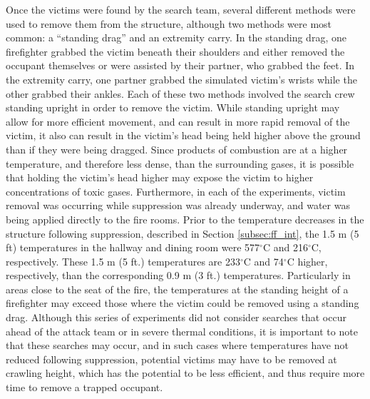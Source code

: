 \documentclass[12pt,oneside]{article}
\begin{document}
Once the victims were found by the search team, several different methods were used to remove them from the structure, although two methods were most common: a ``standing drag'' \cite{IAFC} and an extremity carry. In the standing drag, one firefighter grabbed the victim beneath their shoulders and either removed the occupant themselves or were assisted by their partner, who grabbed the feet. In the extremity carry, one partner grabbed the simulated victim's wrists while the other grabbed their ankles. Each of these two methods involved the search crew standing upright in order to remove the victim. While standing upright may allow for more efficient movement, and can result in more rapid removal of the victim, it also can result in the victim's head being held higher above the ground than if they were being dragged. Since products of combustion are at a higher temperature, and therefore less dense, than the surrounding gases, it is possible that holding the victim's head higher may expose the victim to higher concentrations of toxic gases. Furthermore, in each of the experiments, victim removal was occurring while suppression was already underway, and water was being applied directly to the fire rooms. Prior to the temperature decreases in the structure following suppression, described in Section \ref{subsec:ff_int}, the 1.5 m (5 ft) temperatures in the hallway and dining room were 577$^{\circ}$C and 216$^{\circ}$C, respectively. These 1.5 m (5 ft.) temperatures are 233$^{\circ}$C and 74$^{\circ}$C higher, respectively, than the corresponding 0.9 m (3 ft.) temperatures. Particularly in areas close to the seat of the fire, the temperatures at the standing height of a firefighter may exceed those where the victim could be removed using a standing drag. Although this series of experiments did not consider searches that occur ahead of the attack team or in severe thermal conditions, it is important to note that these searches may occur, and in such cases where temperatures have not reduced following suppression, potential victims may have to be removed at crawling height, which has the potential to be less efficient, and thus require more time to remove a trapped occupant.  
\end{document}
